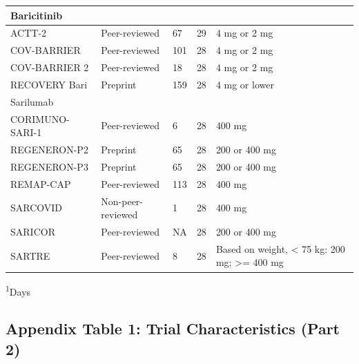 \documentclass[
  12pt,
]{article}
\begin{document}
\begin{landscape}
\begin{longtable}{lllll}
\midrule
\multicolumn{1}{l}{Baricitinib} \\ 
\midrule
ACTT-2 & Peer-reviewed & 67 & 29 & 4 mg or 2 mg \\ 
COV-BARRIER & Peer-reviewed & 101 & 28 & 4 mg or 2 mg \\ 
COV-BARRIER 2 & Peer-reviewed & 18 & 28 & 4 mg or 2 mg \\ 
RECOVERY Bari & Preprint & 159 & 28 & 4 mg or lower \\ 
\midrule
\multicolumn{1}{l}{Sarilumab} \\ 
\midrule
CORIMUNO-SARI-1 & Peer-reviewed & 6 & 28 & 400 mg \\ 
REGENERON-P2 & Preprint & 65 & 28 & 200 or 400 mg \\ 
REGENERON-P3 & Preprint & 65 & 28 & 200 or 400 mg \\ 
REMAP-CAP & Peer-reviewed & 113 & 28 & 400 mg \\ 
SARCOVID & Non-peer-reviewed & 1 & 28 & 400 mg \\ 
SARICOR & Peer-reviewed & NA & 28 & 200 or 400 mg \\ 
SARTRE & Peer-reviewed & 8 & 28 & Based on weight, < 75 kg: 200 mg; >= 400 mg \\ 
 \bottomrule
\end{longtable}
\vspace{-5mm}
\begin{minipage}{\linewidth}
\textsuperscript{1}Days \\ 
\end{minipage}

\newpage

\hypertarget{appendix-table-1-trial-characteristics-part-2}{%
\subsection{Appendix Table 1: Trial Characteristics (Part
2)}\label{appendix-table-1-trial-characteristics-part-2}}


\end{landscape}
\end{document}
